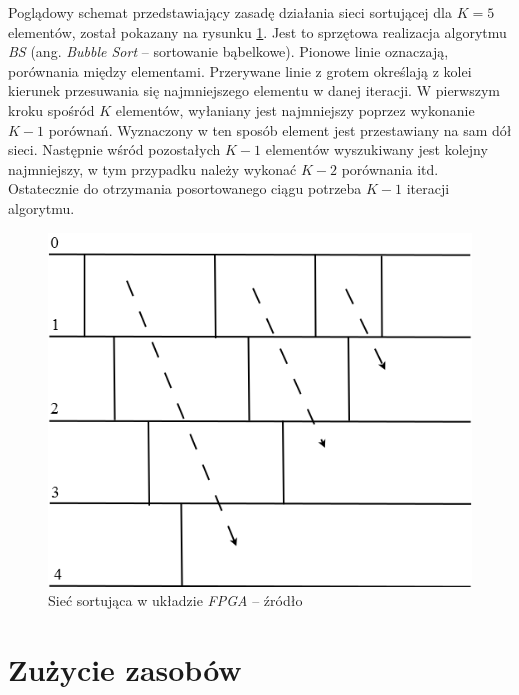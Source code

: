Poglądowy schemat przedstawiający zasadę działania sieci sortującej dla $K=5$ elementów, został pokazany na rysunku \ref{fig:gmm_sort}. Jest to sprzętowa realizacja algorytmu \textit{BS} (ang. \textit{Bubble Sort} -- sortowanie bąbelkowe). Pionowe linie oznaczają, porównania między elementami. Przerywane linie z grotem określają z kolei kierunek przesuwania się najmniejszego elementu w danej iteracji. W pierwszym kroku spośród $K$ elementów, wyłaniany jest najmniejszy poprzez wykonanie $K-1$ porównań. Wyznaczony w ten sposób element jest przestawiany na sam dół sieci. Następnie wśród pozostałych $K-1$ elementów wyszukiwany jest kolejny najmniejszy, w tym przypadku należy wykonać $K-2$ porównania itd. Ostatecznie do otrzymania posortowanego ciągu potrzeba $K-1$ iteracji algorytmu.  
	
	\begin{figure}[h!]
		\centering
		\includegraphics[scale=0.4]{img/4/sort_module.png}
		\caption{Sieć sortująca w układzie \textit{FPGA} -- źródło \cite{piszczek_15}}
		\label{fig:gmm_sort}
	\end{figure}	


\section{Zużycie zasobów}
\label{sec:fpga_zasoby}